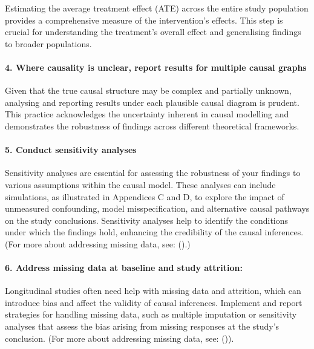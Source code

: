 \documentclass[
  singlecolumn]{article}
\let\oldparagraph\paragraph
\renewcommand{\paragraph}[1]{\oldparagraph{#1}\mbox{}}
\begin{document}
Estimating the average treatment effect (ATE) across the entire study
population provides a comprehensive measure of the intervention's
effects. This step is crucial for understanding the treatment's overall
effect and generalising findings to broader populations.

\paragraph{4. Where causality is unclear, report results for multiple
causal
graphs}\label{where-causality-is-unclear-report-results-for-multiple-causal-graphs}

Given that the true causal structure may be complex and partially
unknown, analysing and reporting results under each plausible causal
diagram is prudent. This practice acknowledges the uncertainty inherent
in causal modelling and demonstrates the robustness of findings across
different theoretical frameworks.

\paragraph{5. Conduct sensitivity
analyses}\label{conduct-sensitivity-analyses}

Sensitivity analyses are essential for assessing the robustness of your
findings to various assumptions within the causal model. These analyses
can include simulations, as illustrated in Appendices C and D, to
explore the impact of unmeasured confounding, model misspecification,
and alternative causal pathways on the study conclusions. Sensitivity
analyses help to identify the conditions under which the findings hold,
enhancing the credibility of the causal inferences.(For more about
addressing missing data, see:
().)

\paragraph{\texorpdfstring{6. \textbf{Address missing data at baseline
and study
attrition}:}{6. Address missing data at baseline and study attrition:}}\label{address-missing-data-at-baseline-and-study-attrition}

Longitudinal studies often need help with missing data and attrition,
which can introduce bias and affect the validity of causal inferences.
Implement and report strategies for handling missing data, such as
multiple imputation or sensitivity analyses that assess the bias arising
from missing responses at the study's conclusion. (For more about
addressing missing data, see:
()).
\end{document}
